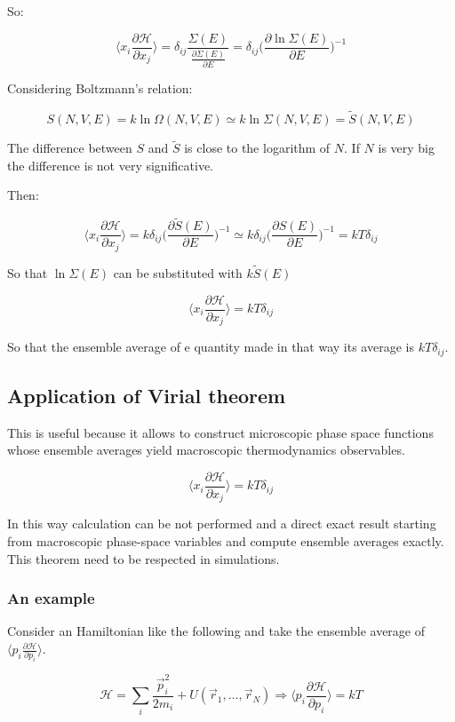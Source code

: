 	So:

	$$\biggl\langle x_i\frac{\partial\mathcal{H}}{\partial x_j}\biggr\rangle = \delta_{ij}\frac{\Sigma(E)}{\frac{\partial\Sigma(E)}{\partial E}} = \delta_{ij}\biggl(\frac{\partial\ln\Sigma(E)}{\partial E}\biggr)^{-1}$$

	Considering Boltzmann's relation:

	$$S(N, V, E) = k\ln\Omega(N, V, E)\simeq k\ln\Sigma(N, V, E) = \tilde{S}(N, V, E)$$

	The difference between $S$ and $\tilde{S}$ is close to the logarithm of $N$.
	If $N$ is very big the difference is not very significative.

	Then:

	$$\biggl\langle x_i\frac{\partial\mathcal{H}}{\partial x_j}\biggr\rangle = k\delta_{ij}\biggl(\frac{\partial\tilde{S}(E)}{\partial E}\biggr)^{-1}\simeq k\delta_{ij}\biggl(\frac{\partial S(E)}{\partial E}\biggr)^{-1} =kT\delta_{ij}$$

	So that $\ln\Sigma(E)$ can be substituted with $k\tilde{S}(E)$

	$$\biggl\langle x_i\frac{\partial\mathcal{H}}{\partial x_j}\biggr\rangle = kT\delta_{ij}$$

	So that the ensemble average of e quantity made in that way its average is $kT\delta_{ij}$.

	\subsection{Application of Virial theorem}
	This is useful because it allows to construct microscopic phase space functions whose ensemble averages yield macroscopic thermodynamics observables.

	$$\biggl\langle x_i\frac{\partial\mathcal{H}}{\partial x_j}\biggr\rangle = kT\delta_{ij}$$

	In this way calculation can be not performed and a direct exact result starting from macroscopic phase-space variables and compute ensemble averages exactly.
	This theorem need to be respected in simulations.


		\subsubsection{An example}
		Consider an Hamiltonian like the following and take the ensemble average of $\biggl\langle p_i\frac{\partial\mathcal{H}}{\partial p_i}\biggr\rangle$.

		$$\mathcal{H} = \sum\limits_i\frac{\vec{p}_i^2}{2m_i} + U(\vec{r}_1, \dots, \vec{r}_N)\Rightarrow\biggl\langle p_i\frac{\partial\mathcal{H}}{\partial p_i}\biggr\rangle = kT$$

